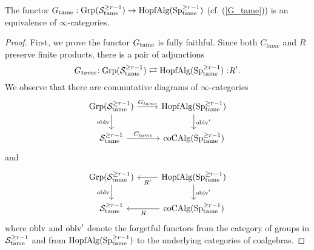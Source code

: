 \begin{theorem}
	The functor $G_{\operatorname{\operatorname{tame}}}: \operatorname{Grp}({\mathcal{S}}^{\geq r-1}_{\operatorname{\operatorname{tame}}})\to \operatorname{HopfAlg}(\operatorname{Sp}^{\geq r-1}_{\operatorname{\operatorname{tame}}})$ (cf. (\ref{G_tame})) is an equivalence of $\infty$-categories.
\end{theorem}
\begin{proof}
First, we prove the functor $G_{\operatorname{\operatorname{tame}}}$ is fully faithful.
Since both $C_{tame}$ and $R$ preserve finite products, there is a pair of adjunctions
\begin{equation}
\label{adj on grps}
	G_{tame}\negmedspace: \operatorname{Grp}({\mathcal{S}}^{\geq r-1}_{\operatorname{\operatorname{tame}}})\rightleftarrows \operatorname{HopfAlg}(\operatorname{Sp}^{\geq r-1}_{\operatorname{\operatorname{tame}}}):\negmedspace R'.
\end{equation}
We observe that there are commutative diagrams of $\infty$-categories
\[
\begin{tikzcd}
	\Grp(\CS^{\geq r-1}_{\tame}) & \Hopfalgebra(\Sp^{\geq r-1}_{\tame})\\
	\CS^{\geq r-1}_{\tame}  & 
	\coCAlg(\Sp^{\geq r-1}_{\tame})
	\arrow[from=1-1, to= 1-2, "G_{tame}"]
	\arrow[from=1-1, to=2-1, "\oblv" left]
	\arrow[from=1-2, to=2-2, "\oblv'" ]
	\arrow[from=2-1, to= 2-2, "C_{tame}"]
\end{tikzcd}
\]
and 
\[
\begin{tikzcd}
	\Grp(\CS^{\geq r-1}_{\tame}) & \Hopfalgebra(\Sp^{\geq r-1}_{\tame})\\
	\CS^{\geq r-1}_{\tame}  & 
	\coCAlg(\Sp^{\geq r-1}_{\tame})
	\arrow[from=1-2, to= 1-1, "R'"]
	\arrow[from=1-1, to=2-1, "\oblv" left]
	\arrow[from=1-2, to=2-2, "\oblv'" ]
	\arrow[from=2-2, to= 2-1, "R"]
\end{tikzcd}
\]
where $\operatorname{oblv}$ and $\operatorname{oblv}'$ denote the forgetful functors from the category of groups in ${\mathcal{S}}^{\geq r-1}_{\operatorname{\operatorname{tame}}}$ and from $\operatorname{HopfAlg}(\operatorname{Sp}^{\geq r-1}_{\operatorname{\operatorname{tame}}})$ to the underlying categories of coalgebras.


\end{proof}

